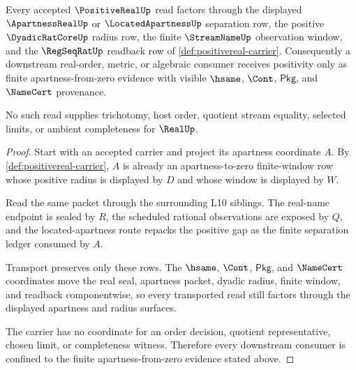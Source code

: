 \begin{theorem}
\label{thm:positivereal-apartness-handoff}
Every accepted $\PositiveRealUp$ read factors through the displayed
$\ApartnessRealUp$ or $\LocatedApartnessUp$ separation row, the positive
$\DyadicRatCoreUp$ radius row, the finite $\StreamNameUp$ observation window,
and the $\RegSeqRatUp$ readback row of
\autoref{def:positivereal-carrier}. Consequently a downstream real-order,
metric, or algebraic consumer receives positivity only as finite
apartness-from-zero evidence with visible $\hsame$, $\Cont$, $\mathsf{Pkg}$,
and $\NameCert$ provenance.

No such read supplies trichotomy, host order, quotient stream equality,
selected limits, or ambient completeness for $\RealUp$.
\end{theorem}
\begin{proof}
Start with an accepted carrier and project its apartness coordinate $A$. By
\autoref{def:positivereal-carrier}, $A$ is already an apartness-to-zero
finite-window row whose positive radius is displayed by $D$ and whose window is
displayed by $W$.

Read the same packet through the surrounding L10 siblings. The real-name
endpoint is sealed by $R$, the scheduled rational observations are exposed by
$Q$, and the located-apartness route repacks the positive gap as the finite
separation ledger consumed by $A$.

Transport preserves only these rows. The $\hsame$, $\Cont$, $\mathsf{Pkg}$,
and $\NameCert$ coordinates move the real seal, apartness packet, dyadic
radius, finite window, and readback componentwise, so every transported read
still factors through the displayed apartness and radius surfaces.

The carrier has no coordinate for an order decision, quotient representative,
chosen limit, or completeness witness. Therefore every downstream consumer is
confined to the finite apartness-from-zero evidence stated above.
\end{proof}

